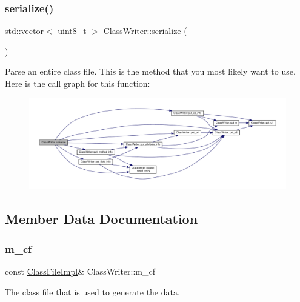 \subsubsection{\texorpdfstring{serialize()}{serialize()}}
{\footnotesize\ttfamily std\+::vector$<$ uint8\+\_\+t $>$ Class\+Writer\+::serialize (\begin{DoxyParamCaption}{ }\end{DoxyParamCaption})}

Parse an entire class file. This is the method that you most likely want to use. Here is the call graph for this function\+:
\nopagebreak
\begin{figure}[H]
\begin{center}
\leavevmode
\includegraphics[width=350pt]{classClassWriter_a7be4d13b5665b1e85a8a350ec181951c_cgraph}
\end{center}
\end{figure}


\subsection{Member Data Documentation}
\mbox{\label{classClassWriter_a4c495c4307d3634865d0a4d4024d4a37}} 
\subsubsection{\texorpdfstring{m\+\_\+cf}{m\_cf}}
{\footnotesize\ttfamily const \hyperlink{classClassFileImpl}{Class\+File\+Impl}\& Class\+Writer\+::m\+\_\+cf\hspace{0.3cm}{\ttfamily [private]}}



The class file that is used to generate the data. 

\mbox{\label{classClassWriter_a8a5c126a562b0329307a15386ff389f8}} 
